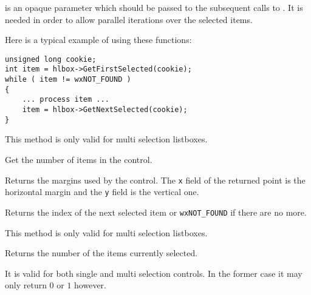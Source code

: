  is an opaque parameter which should be passed to the subsequent
calls to . It is needed in
order to allow parallel iterations over the selected items.

Here is a typical example of using these functions:
\begin{verbatim}
unsigned long cookie;
int item = hlbox->GetFirstSelected(cookie);
while ( item != wxNOT_FOUND )
{
    ... process item ...
    item = hlbox->GetNextSelected(cookie);
}
\end{verbatim}

This method is only valid for multi selection listboxes.


\label{wxvlistboxgetitemcount}


Get the number of items in the control.




\label{wxvlistboxgetmargins}


Returns the margins used by the control. The {\tt x} field of the returned
point is the horizontal margin and the {\tt y} field is the vertical one.




\label{wxvlistboxgetnextselected}


Returns the index of the next selected item or {\tt wxNOT\_FOUND} if there are
no more.

This method is only valid for multi selection listboxes.




\label{wxvlistboxgetselectedcount}


Returns the number of the items currently selected.

It is valid for both single and multi selection controls. In the former case it
may only return $0$ or $1$ however.

